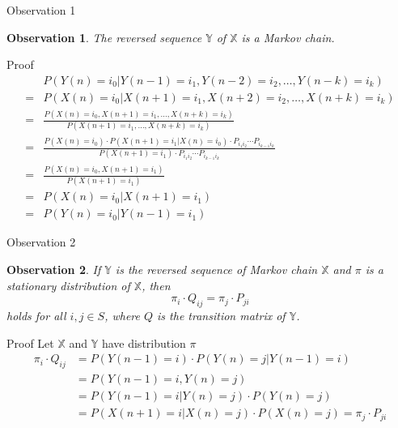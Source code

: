 \documentclass[mathserif]{beamer}
\newtheorem{obs}{Observation}
\begin{document}
\begin{frame}{Observation 1}
\begin{obs}
The reversed sequence $\mathbb{Y}$ of $\mathbb{X}$ is a Markov chain.
\end{obs}
\end{frame}

\begin{frame}{Proof}
\begin{align*}
& P(Y(n) = i_0 | Y(n-1) = i_1, Y(n-2) = i_2, \ldots , Y(n-k) = i_k) \\
= & P(X(n) = i_0 | X(n+1) = i_1, X(n+2) = i_2, \ldots , X(n+k) = i_k) \\
= & \frac{P(X(n) = i_0, X(n+1) = i_1, \ldots , X(n+k) = i_k)}{P(X(n+1) = i_1, \ldots , X(n+k) = i_k)} \\
= & \frac{P(X(n)=i_0)\cdot P(X(n+1)=i_1|X(n)=i_0)\cdot P_{i_1 i_2}\cdots P_{i_{k-1}i_k}}{P(X(n+1)=i_1)\cdot P_{i_1 i_2}\cdots P_{i_{k-1}i_k}} \\
= & \frac{P(X(n)=i_0, X(n+1)=i_1)}{P(X(n+1)=i_1)} \\
= & P(X(n)=i_0|X(n+1)=i_1) \\
= & P(Y(n)=i_0|Y(n-1)=i_1)
\end{align*}
\end{frame}

\begin{frame}{Observation 2}
\begin{obs}
If $\mathbb{Y}$ is the reversed sequence of Markov chain $\mathbb{X}$ and $\pi$ is a stationary distribution of $\mathbb{X}$, then
\[
\pi_i \cdot Q_{ij} = \pi_j \cdot P_{ji}
\]
holds for all $i,j \in S$, where $Q$ is the transition matrix of $\mathbb{Y}$.
\end{obs}
\end{frame}

\begin{frame}{Proof}
Let $\mathbb{X}$ and $\mathbb{Y}$ have distribution $\pi$
\begin{align*}
\pi_i \cdot Q_{ij} & = P(Y(n-1)=i)\cdot P(Y(n)=j|Y(n-1)=i) \\
& = P(Y(n-1)=i, Y(n)=j) \\
& = P(Y(n-1)=i|Y(n)=j)\cdot P(Y(n)=j) \\
& = P(X(n+1)=i|X(n)=j)\cdot P(X(n)=j) = \pi_j \cdot P_{ji}
\end{align*}
\end{frame}
\end{document}

